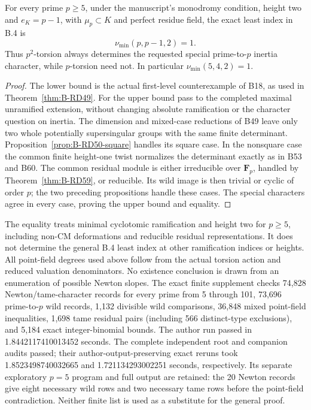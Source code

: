 \begin{theorem}
\label{thm:B-RD61}
For every prime $p\ge5$, under the manuscript's monodromy condition,
height two and $e_K=p-1$, with $\mu_p\subset K$ and perfect residue
field, the exact least index in B.4 is
\[
                         \nu_{\min}(p,p-1,2)=1.         \tag{B-RD61.4}
\]
Thus $p^2$-torsion always determines the requested special
prime-to-$p$ inertia character, while $p$-torsion need not.
In particular $\nu_{\min}(5,4,2)=1$.
\end{theorem}
\begin{proof}
The lower bound is the actual first-level counterexample of B18,
as used in Theorem~\ref{thm:B-RD49}. For the upper bound pass to
the completed maximal unramified extension, without changing
absolute ramification or the character question on inertia.
The dimension and mixed-case reductions of B49 leave only two
whole potentially supersingular groups with the same finite
determinant. Proposition~\ref{prop:B-RD50-square} handles its
square case. In the nonsquare case the common finite height-one
twist normalizes the determinant exactly as in B53 and B60.
The common residual module is either irreducible over $\mathbf F_p$,
handled by Theorem~\ref{thm:B-RD59}, or reducible. Its wild image
is then trivial or cyclic of order $p$; the two preceding
propositions handle these cases. The special characters agree
in every case, proving the upper bound and equality.
\end{proof}

\begin{remark}
\label{rem:B-RD61-scope}
The equality treats minimal cyclotomic ramification and height two
for $p\ge5$, including non-CM deformations and reducible residual
representations. It does not determine the general B.4 least index
at other ramification indices or heights. All point-field degrees
used above follow from the actual torsion action and reduced
valuation denominators. No existence conclusion is drawn from
an enumeration of possible Newton slopes.
The exact finite supplement
checks 74,828 Newton/tame-character records for every prime from
5 through 101, 73,696 prime-to-$p$ wild records, 1,132 divisible
wild comparisons, 36,848 mixed point-field inequalities, 1,698
tame residual pairs (including 566 distinct-type exclusions), and
5,184 exact integer-binomial bounds. The author run passed in
1.8442117410013452 seconds. The complete independent root and
companion audits passed; their author-output-preserving exact reruns
took 1.8523498740032665 and 1.721134293002251 seconds, respectively. Its separate exploratory $p=5$ program
and full output are retained: the 20 Newton records give eight
necessary wild rows and two necessary tame rows before the
point-field contradiction. Neither finite list is used as a
substitute for the general proof.
\end{remark}


